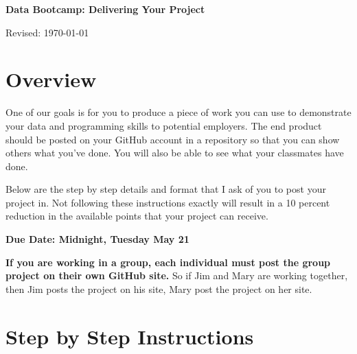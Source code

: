 


\pagestyle{headandfoot}
\runningheadrule
\firstpageheadrule
{}
\runningfooter{}{}{}



\bigskip\bigskip
\centerline{\Large \bf Data Bootcamp:  Delivering Your Project}
\centerline{Revised: \today}

\section*{Overview}

One of our goals is for you to produce a piece of work you can use to demonstrate your data and programming skills to potential employers. The end product should be posted on your GitHub account in a repository so that
you can show others what you've done. You will also be able to see what your classmates have done.

Below are the step by step details and format that I ask of you to post your project in. Not following these instructions exactly will result in a 10 percent reduction in the available points that your project can receive.

\textbf{Due Date: Midnight, Tuesday May 21}

\textbf{If you are working in a group, each individual must post the group project on their own GitHub site.} So if Jim and Mary are working together, then Jim posts the project on his site, Mary post the project on her site.

\section*{Step by Step Instructions}

